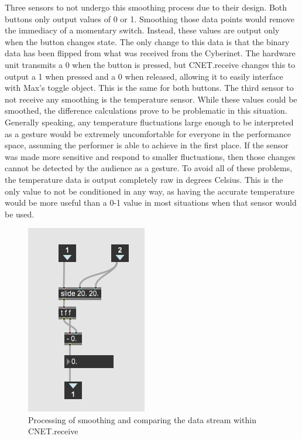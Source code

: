 Three sensors to not undergo this smoothing process due to their design. Both buttons only output values of 0 or 1. Smoothing those data points would remove the immediacy of a momentary switch. Instead, these values are output only when the button changes state. The only change to this data is that the binary data has been flipped from what was received from the Cyberinet. The hardware unit transmits a 0 when the button is pressed, but CNET.receive changes this to output a 1 when pressed and a 0 when released, allowing it to easily interface with Max's toggle object. This is the same for both buttons. The third sensor to not receive any smoothing is the temperature sensor. While these values could be smoothed, the difference calculations prove to be problematic in this situation. Generally speaking, any temperature fluctuations large enough to be interpreted as a gesture would be extremely uncomfortable for everyone in the performance space, assuming the performer is able to achieve in the first place. If the sensor was made more sensitive and respond to smaller fluctuations, then those changes cannot be detected by the audience as a gesture. To avoid all of these problems, the temperature data is output completely raw in degrees Celsius. This is the only value to not be conditioned in any way, as having the accurate temperature would be more useful than a 0-1 value in most situations when that sensor would be used.


\begin{figure}
    \centering
    \includegraphics[scale=1.3]{diagrams/maxPatches/smoothr.png}
    \caption{Processing of smoothing and comparing the data stream within CNET.receive}
    \label{fig:smoothr}
\end{figure}

